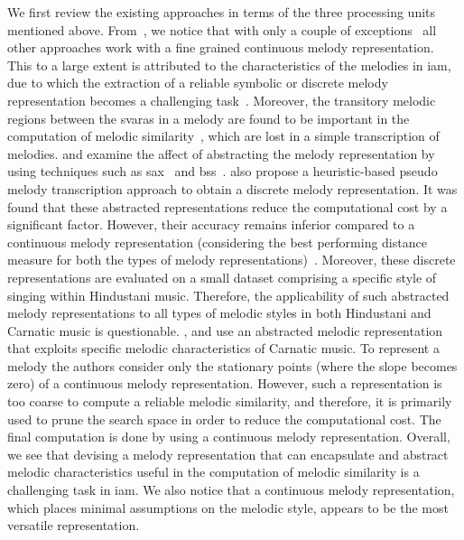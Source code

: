 We first review the existing approaches in terms of the three processing units mentioned above. From~, we notice that with only a couple of exceptions~\citep{Ross2012b,ganguli2015efficient} all other approaches work with a fine grained continuous melody representation. This to a large extent is attributed to the characteristics of the melodies in \gls{iam}, due to which the extraction of a reliable symbolic or discrete melody representation becomes a challenging task~\citep{widdess1994involving}. Moreover, the transitory melodic regions between the \glspl{svara} in a melody are found to be important in the computation of melodic similarity~\citep{Datta2007,gupta2012objective}, which are lost in a simple transcription of melodies. \cite{Ross2012b} and \cite{ganguli2015efficient} examine the affect of abstracting the melody representation by using techniques such as \gls{sax}~\citep{Lin2003} and \gls{bss}~\citep{tanaka2005discovery}. \cite{ganguli2015efficient} also propose a heuristic-based pseudo melody transcription approach to obtain a discrete melody representation. It was found that these abstracted representations reduce the computational cost by a significant factor. However, their accuracy remains inferior compared to a continuous melody representation (considering the best performing distance measure for both the types of melody representations)~\citep{Ross2012b,ganguli2015efficient}. Moreover, these discrete representations are evaluated on a small dataset comprising a specific style of singing within Hindustani music. Therefore, the applicability of such abstracted melody representations to all types of melodic styles in both Hindustani and Carnatic music is questionable. \cite{Ishwar2013}, \cite{Dutta2014} and \cite{dutta2014modified} use an abstracted melodic representation that exploits specific melodic characteristics of Carnatic music. To represent a melody the authors consider only the stationary points (where the slope becomes zero) of a continuous melody representation. However, such a representation is too coarse to compute a reliable melodic similarity, and therefore, it is primarily used to prune the search space in order to reduce the computational cost. The final computation is done by using a continuous melody representation. Overall, we see that devising a melody representation that can encapsulate and abstract melodic characteristics useful in the computation of melodic similarity is a challenging task in \gls{iam}. We also notice that a continuous melody representation, which places minimal assumptions on the melodic style, appears to be the most versatile representation. 

